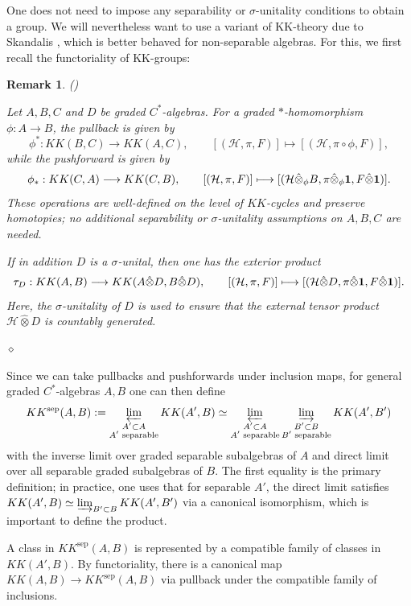 \documentclass[12pt]{amsart}
\newtheorem{remark}[theorem]{Remark}
\newcommand{\Hh}{{\mathcal H}}
\newcommand{\one}{{\bf 1}}
\begin{document}
One does not need to impose any separability or $\sigma$-unitality conditions to obtain a group. We will nevertheless want to use a variant of KK-theory due to Skandalis \cite{Skandalis1988}, which is better behaved for non-separable algebras. For this, we first recall the functoriality of KK-groups:
\begin{remark}({\cite{Skandalis1984}})
\label{rmk:pullback}
{\rm 
Let $A,B,C$ and $D$ be graded $C^*$-algebras.
For a graded $*$-homomorphism $\phi:A\to B$, the pullback is given by
\[\phi^*:KK(B,C)\longrightarrow KK(A,C),\qquad [(\Hh,\pi,F)]\longmapsto[(\Hh,\pi\circ\phi,F)],\] 
while the pushforward is given by
\[\phi_*:KK(C,A)\longrightarrow KK(C,B),\qquad [(\Hh,\pi,F)]\longmapsto[(\Hh\hat{\otimes}_\phi B,\pi\hat{\otimes}_\phi \one,F\hat{\otimes} \one)].\]
These operations are well-defined on the level of $KK$-cycles and preserve homotopies; no additional separability or $\sigma$-unitality assumptions on $A,B,C$ are needed.

If in addition $D$ is a $\sigma$-unital, then one has the exterior product
\[\tau_D:KK(A,B)\longrightarrow KK(A\hat{\otimes}D,B\hat{\otimes}D),\qquad [(\Hh,\pi,F)]\longmapsto[(\Hh\hat{\otimes} D,\pi\hat{\otimes} \one,F\hat{\otimes} \one)].\]
Here, the $\sigma$-unitality of $D$ is used to ensure that the external tensor product $\Hh\hat{\otimes} D$ is countably generated. 
}
$\diamond$
\end{remark}

Since we can take pullbacks and pushforwards under inclusion maps, for general graded $C^*$-algebras $A,B$ one can then define \cite{Skandalis1988,AntoniniAzzaliSkandalis2020}
\[KK^{\mathrm{sep}}(A,B):= \varprojlim_{\substack{ A'\subset A \\ A' \text{ separable}}} KK(A', B) \simeq \varprojlim_{\substack{ A'\subset A \\ A' \text{ separable}}} \varinjlim_{\substack{ B'\subset B \\ B' \text{ separable}}}KK(A', B')\]
with the inverse limit over graded separable subalgebras of $A$ and direct limit over all separable graded subalgebras of $B$. 
The first equality is the primary definition; in practice, one uses that for separable $A'$, the direct limit satisfies $KK(A',B)\simeq \varinjlim_{B'\subset B}KK(A', B')$ via a canonical isomorphism, which is important to define the product. 

A class in $KK^{\mathrm{sep}}(A,B)$ is represented by a compatible family of classes in $KK(A',B)$. By functoriality, there is a canonical map $KK(A,B)\to KK^{\mathrm{sep}}(A,B)$ via pullback under the compatible family of inclusions. 
\end{document}
